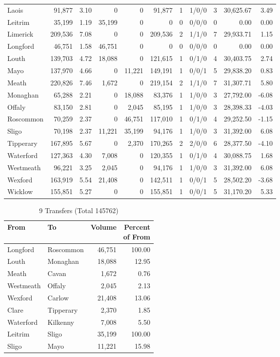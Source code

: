 \documentclass[a4paper]{article}
\begin{document}
\begin{longtable}{lrrrrrrlrrr}
Laois&91,877& 3.10&0&0&91,877&1&1/0/0&3&30,625.67& 3.49\\ 
Leitrim&35,199& 1.19&35,199&0&0&0&0/0/0&0& 0.00& 0.00\\ 
Limerick&209,536& 7.08&0&0&209,536&2&1/1/0&7&29,933.71& 1.15\\ 
Longford&46,751& 1.58&46,751&0&0&0&0/0/0&0& 0.00& 0.00\\ 
Louth&139,703& 4.72&18,088&0&121,615&1&0/1/0&4&30,403.75& 2.74\\ 
Mayo&137,970& 4.66&0&11,221&149,191&1&0/0/1&5&29,838.20& 0.83\\ 
Meath&220,826& 7.46&1,672&0&219,154&2&1/1/0&7&31,307.71& 5.80\\ 
Monaghan&65,288& 2.21&0&18,088&83,376&1&1/0/0&3&27,792.00&-6.08\\ 
Offaly&83,150& 2.81&0&2,045&85,195&1&1/0/0&3&28,398.33&-4.03\\ 
Roscommon&70,259& 2.37&0&46,751&117,010&1&0/1/0&4&29,252.50&-1.15\\ 
Sligo&70,198& 2.37&11,221&35,199&94,176&1&1/0/0&3&31,392.00& 6.08\\ 
Tipperary&167,895& 5.67&0&2,370&170,265&2&2/0/0&6&28,377.50&-4.10\\ 
Waterford&127,363& 4.30&7,008&0&120,355&1&0/1/0&4&30,088.75& 1.68\\ 
Westmeath&96,221& 3.25&2,045&0&94,176&1&1/0/0&3&31,392.00& 6.08\\ 
Wexford&163,919& 5.54&21,408&0&142,511&1&0/0/1&5&28,502.20&-3.68\\ 
Wicklow&155,851& 5.27&0&0&155,851&1&0/0/1&5&31,170.20& 5.33\\ 
\end{longtable}

\begin{table}[htbp]
\caption{9 Transfers (Total 145762)}
\centering
\begin{tabular}{llrr} \toprule
From &To &Volume &\shortstack{Percent\\of From} \\ \midrule
Longford&Roscommon&46,751&100.00\\ 
Louth&Monaghan&18,088&12.95\\ 
Meath&Cavan&1,672& 0.76\\ 
Westmeath&Offaly&2,045& 2.13\\ 
Wexford&Carlow&21,408&13.06\\ 
Clare&Tipperary&2,370& 1.85\\ 
Waterford&Kilkenny&7,008& 5.50\\ 
Leitrim&Sligo&35,199&100.00\\ 
Sligo&Mayo&11,221&15.98\\ 
\bottomrule
\end{tabular}
\end{table}
\end{document}
